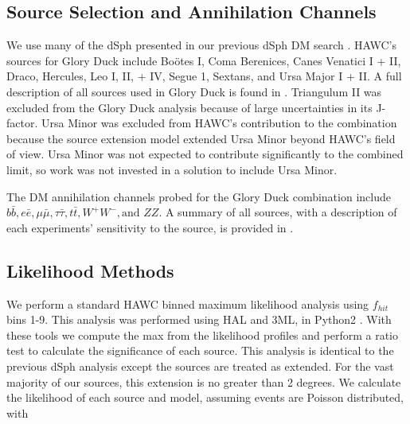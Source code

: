 \subsection{Source Selection and Annihilation Channels}

We use many of the dSph presented in our previous dSph DM search \cite{Albert_2018}.
HAWC's sources for Glory Duck include Boötes I, Coma Berenices, Canes Venatici I + II, Draco, Hercules, Leo I, II, + IV, Segue 1, Sextans, and Ursa Major I + II.
A full description of all sources used in Glory Duck is found in .
Triangulum II was excluded from the Glory Duck analysis because of large uncertainties in its J-factor.
Ursa Minor was excluded from HAWC's contribution to the combination because the source extension model extended Ursa Minor beyond HAWC's field of view.
Ursa Minor was not expected to contribute significantly to the combined limit, so work was not invested in a solution to include Ursa Minor.

\sloppy The DM annihilation channels probed for the Glory Duck combination include $b\bar{b}, e\bar{e}, \mu\bar{\mu}, \tau\bar{\tau}, t\bar{t}, W^+W^-, \textrm{and }ZZ$.
A summary of all sources, with a description of each experiments' sensitivity to the source, is provided in .




\subsection{Likelihood Methods} \label{sec:ll_methods}

We perform a standard HAWC binned maximum likelihood analysis using $f_{hit}$ bins 1-9.
This analysis was performed using HAL and 3ML, in Python2 \cite{Abeysekara_2017, vianello2015multimission}.
With these tools we compute the max from the likelihood profiles and perform a ratio test to calculate the significance of each source.
This analysis is identical to the previous dSph analysis \cite{Albert_2018} except the sources are treated as extended.
For the vast majority of our sources, this extension is no greater than 2 degrees.
We calculate the likelihood of each source and model, assuming events are Poisson distributed, with
\hwcpsLLH


